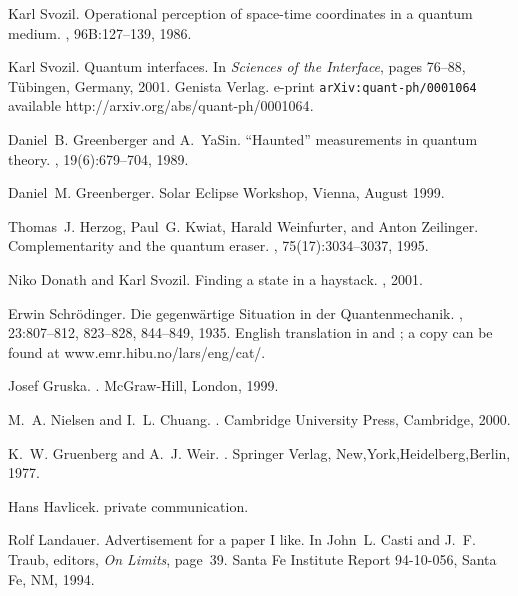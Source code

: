 \begin{thebibliography}{10}
Karl Svozil.
\newblock Operational perception of space-time coordinates in a quantum medium.
, 96B:127--139, 1986.

Karl Svozil.
\newblock Quantum interfaces.
\newblock In {\em Sciences of the Interface}, pages 76--88, T{\"{u}}bingen,
  Germany, 2001. Genista Verlag.
\newblock e-print {\tt arXiv:quant-ph/0001064} available
  {http://arxiv.org/abs/quant-ph/0001064}.

Daniel~B. Greenberger and A.~YaSin.
\newblock ``{H}aunted'' measurements in quantum theory.
, 19(6):679--704, 1989.

Daniel~M. Greenberger.
\newblock Solar Eclipse Workshop, Vienna, August 1999.

Thomas~J. Herzog, Paul~G. Kwiat, Harald Weinfurter, and Anton Zeilinger.
\newblock Complementarity and the quantum eraser.
, 75(17):3034--3037, 1995.

Niko Donath and Karl Svozil.
\newblock Finding a state in a haystack.
, 2001.

Erwin Schr{\"{o}}dinger.
\newblock Die gegenw{\"{a}}rtige {S}ituation in der {Q}uantenmechanik.
, 23:807--812, 823--828, 844--849, 1935.
\newblock English translation in \cite{trimmer} and \cite[pp.
  152-167]{wheeler-Zurek:83}; a copy can be found at
  www.emr.hibu.no/lars/eng/cat/.

Josef Gruska.
.
\newblock McGraw-Hill, London, 1999.

M.~A. Nielsen and I.~L. Chuang.
.
\newblock Cambridge University Press, Cambridge, 2000.

K.~W. Gruenberg and A.~J. Weir.
.
\newblock Springer Verlag, New,York,Heidelberg,Berlin, 1977.

Hans Havlicek.
\newblock private communication.

Rolf Landauer.
\newblock Advertisement for a paper {I} like.
\newblock In John~L. Casti and J.~F. Traub, editors, {\em On Limits}, page~39.
  Santa Fe Institute Report 94-10-056, Santa Fe, NM, 1994.


\end{thebibliography}
